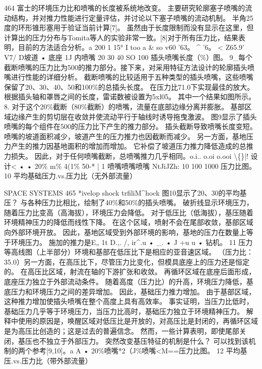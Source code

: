 \documentclass[UTF8,11pt,a4paper,openany,fontset=fandol]{ctexbook}
\begin{document}
464 富士的环境压力比和喷嘴的长度被系统地改变。 主要研究轮廓塞子喷嘴的流动结构，并对推力性能进行定量评估，并讨论以下塞子喷嘴的流动机制。 半角25度的环形锥形塞用于验证当前计算[7]。 虽然由于长度限制而没有显示在这里，但计算出的压力分布与Tomita等人的实验非常一致。[8]对于所有压力比，结果表明，目前的方法适合分析。a 200 1 15° I too a \& so v60 '63。 \textasciicircum{} '6。 < Z65.9' V7/ D坡道 • 底座 1J 内喷嘴 20 30 40 SO 100 插头喷嘴长度（\%）图。 9\_每个截断喷嘴的压力比为500的推力部分。接下来，对采用特征方法设计的轮廓插头喷嘴进行性能的详细分析。 截断喷嘴的比较适用于五种类型的插头喷嘴，这些喷嘴保留了20、30、40、50和100\%的总插头长度。 在压力比71.0下实现最佳的放大。 根据插头轴和罩唇之间的长度，雷诺数被设置为5xl05。 其中一个结果如图所示。 8. 对于这个20\%截断（80\%截断）的喷嘴，流量在底部边缘分离并膨胀。 基部区域边缘产生的剪切层在收敛并使流动平行于轴线时诱导拖曳激波。 图9显示了插头喷嘴的每个组件在500的压力比下产生的推力部分。 插头截断导致喷嘴长度变短。 喷嘴的坡道面积减少，坡道产生的压力推力也因截断而减少。 另一方面，基地压力产生的推力因基地面积的增加而增加。 它补偿了坡道压力推力降低造成的总推力损失。 因此，对于任何喷嘴截断，总喷嘴推力几乎相同。o.i.. o.oi o.ooi \textbackslash\{\}|! 设计< • • 20\% m\% 4(1\% 50-* | 1 喷嘴喷嘴喷嘴 NtJiJZh: 10 100 1000 压力比图。 10 平均基础压力.vs.压力比（无外部流量）

SPACE SYSTEMS 465 *ivelop shock trfiliM\textasciicircum{}hock 图10显示了20、30的平均基压？ 与各种压力比相比，绘制了40\%和50\%的插头喷嘴。 破折线显示环境压力，随着压力比变高（高海拔），环境压力会降低。 对于低压比（低海拔），基压随着环境精神压力的降低而线性下降。 在这个区域，喷射不会在尾部收敛，基部区域向外部环境开放。 因此，基地区域受到外部环境的影响，基地的压力在数量上等于环境压力。 施加的推力是E„ 1t D.,. /, ir\textasciicircum{}.u • \_. • J +u u • 钻机。 11 压力等高线图（上半部分）环境和基部在低压比下是相应的亚音速区域。 （压力比：35.0）另一方面，在高压比下，尽管压力比变化，但模具底座上的压力还是恒定的。 在高压比区域，射流在轴的下游扩张和收敛。 再循环区域在底座后面形成，底座压力独立于外部流动条件。 随着高度（压力比）的升高，环境压力降低，基底压力和环境压力之间的差异增加。 因此，基础压力推力增加。 由于基部区域，这种推力增加使插头喷嘴在整个高度上具有高效率。 事实证明，当压力比低时，基础压力几乎等于环境压力，当压力比高时，基础压力独立于环境精神压力。 解释中使用的原因是，唤醒区域对低压比是开放的，对高压比是封闭的，再循环区域是为高压比创造的；这是过去的普遍信念。 然而，一些计算表明，即使尾部关闭，基压也不独立于外部压力。 突然改变基压特征的机制是什么？ 可以找到该机制的两个参考[9,10]。a A • 20\%喷嘴*2（J\%喷嘴<M==压力比图。 12 平均基压.vs.压力比（带外部流量）
\end{document}
